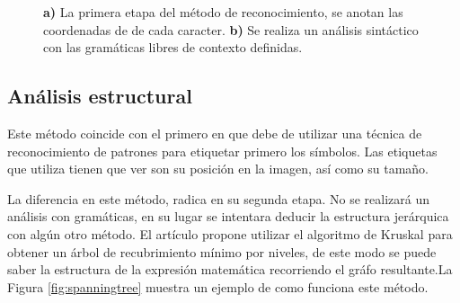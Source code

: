 \begin{figure}[h]
	\centering
	\caption{\textbf{a)} La primera etapa del método de reconocimiento, se anotan las coordenadas de de cada caracter. \textbf{b)} Se realiza un análisis sintáctico con las gramáticas libres de contexto definidas.}
	\label{fig:gramaticas}
\end{figure}

\subsection{Análisis estructural}

Este método coincide con el primero en que debe de utilizar una técnica de reconocimiento de patrones para etiquetar primero los símbolos. Las etiquetas que utiliza tienen que ver son su posición en la imagen, así como su tamaño. 

La diferencia en este método, radica en su segunda etapa. No se realizará un análisis con gramáticas, en su lugar se intentara deducir la estructura jerárquica con algún otro método. El artículo \cite{spanningtree} propone utilizar el algoritmo de Kruskal para obtener un árbol de recubrimiento mínimo por niveles, de este modo se puede saber la estructura de la expresión matemática recorriendo el gráfo resultante.La Figura \ref{fig:spanningtree} muestra un ejemplo de como funciona este método.

